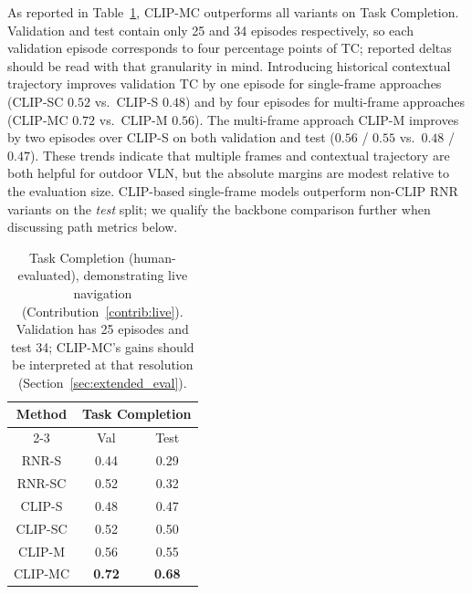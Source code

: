 As reported in Table~\ref{table:task_completion}, CLIP-MC outperforms all variants on Task Completion. Validation and test contain only 25 and 34 episodes respectively, so each validation episode corresponds to four percentage points of TC; reported deltas should be read with that granularity in mind. Introducing historical contextual trajectory improves validation TC by one episode for single-frame approaches (CLIP-SC $0.52$ vs.\ CLIP-S $0.48$) and by four episodes for multi-frame approaches (CLIP-MC $0.72$ vs.\ CLIP-M $0.56$). The multi-frame approach CLIP-M improves by two episodes over CLIP-S on both validation and test ($0.56$ / $0.55$ vs.\ $0.48$ / $0.47$). These trends indicate that multiple frames and contextual trajectory are both helpful for outdoor VLN, but the absolute margins are modest relative to the evaluation size. CLIP-based single-frame models outperform non-CLIP RNR variants on the \emph{test} split; we qualify the backbone comparison further when discussing path metrics below.

\begin{table}[ht]
\begin{center}
\begin{tabular}{|c|cc|}
\hline
\multirow{2}{*}{Method} & \multicolumn{2}{c|}{Task Completion} \\ \cline{2-3}
                        & \multicolumn{1}{c|}{Val} & Test \\ \hline
RNR-S                   & \multicolumn{1}{c|}{0.44} & 0.29 \\ \hline
RNR-SC                  & \multicolumn{1}{c|}{0.52} & 0.32 \\ \hline
CLIP-S                  & \multicolumn{1}{c|}{0.48} & 0.47 \\ \hline
CLIP-SC                 & \multicolumn{1}{c|}{0.52} & 0.50 \\ \hline
CLIP-M                  & \multicolumn{1}{c|}{0.56} & 0.55 \\ \hline
CLIP-MC                 & \multicolumn{1}{c|}{\textbf{0.72}} & \textbf{0.68} \\ \hline
\end{tabular}
\end{center}
\caption[Task Completion on CARLA-NAV]{Task Completion (human-evaluated), demonstrating live navigation (Contribution~\ref{contrib:live}). Validation has 25 episodes and test 34; CLIP-MC's gains should be interpreted at that resolution (Section~\ref{sec:extended_eval}).}
\label{table:task_completion}
\end{table}

